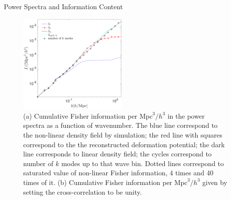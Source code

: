 \begin{section}{Power Spectra and Information Content}
\begin{figure}
  \includegraphics[width=0.48\textwidth]{fisher_best_analysis-crop.pdf}
\centering
   \caption{(a) Cumulative Fisher information per $\mathrm{Mpc}^3/h^3$ in the power spectra 
as a function of wavenumber. The blue line correspond to the non-linear density field by 
simulation; the red line with squares correspond to the the reconstructed deformation 
potential; the dark line corresponds to linear density field; the cycles correspond to number 
of $k$ modes up to that wave bin. Dotted lines correspond to saturated value of 
non-linear Fisher information, 4 times and 40 times of it. (b) Cumulative Fisher information 
per $\mathrm{Mpc}^3/h^3$ given by setting the cross-correlation to be unity.}
  \label{fig:fisherinfo}

\end{figure}

\end{section}
